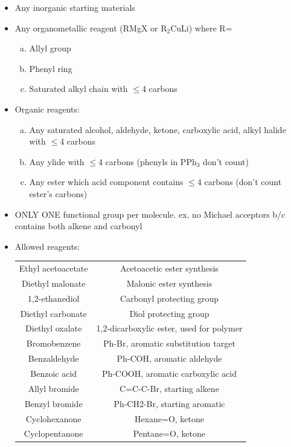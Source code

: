 \documentclass[10pt,landscape]{article}
\begin{document}
\begin{multicols*}{3}
\begin{scriptsize}
    \begin{itemize}
    \item Any inorganic starting materials
    \item Any organometallic reagent (RMgX or R$_2$CuLi) where R=
      \begin{enumerate}[a)]
      \item Allyl group
      \item Phenyl ring
      \item Saturated alkyl chain with $\leq$4 carbons
      \end{enumerate}
    \item Organic reagents:
      \begin{enumerate}[a)]
      \item Any saturated alcohol, aldehyde, ketone, carboxylic acid, alkyl halide with
        $\leq$4 carbons
      \item Any ylide with $\leq$4 carbons (phenyls in PPh$_3$ don't count)
      \item Any ester which acid component contains $\leq$4 carbons (don't count ester's
        carbons)
      \end{enumerate}
    \item ONLY ONE functional group per molecule. ex. no Michael acceptors b/c contains
      both alkene and carbonyl
    \item Allowed reagents:
      \begin{tabular}{c|c}
        Ethyl acetoacetate & Acetoacetic ester synthesis\\
        Diethyl malonate & Malonic ester synthesis\\
        1,2-ethanediol & Carbonyl protecting group\\
        Diethyl carbonate & Diol protecting group\\
        Diethyl oxalate & 1,2-dicarboxylic ester, used for polymer \\
        Bromobenzene & Ph-Br, aromatic substitution target\\
        Benzaldehyde & Ph-COH, aromatic aldehyde\\
        Benzoic acid & Ph-COOH, aromatic carboxylic acid\\
        Allyl bromide & C=C-C-Br, starting alkene\\
        Benzyl bromide & Ph-CH2-Br, starting aromatic \\
        Cyclohexanone & Hexane=O, ketone\\
        Cyclopentanone & Pentane=O, ketone\\

\end{tabular}
\end{itemize}
\end{scriptsize}
\end{multicols*}
\end{document}
